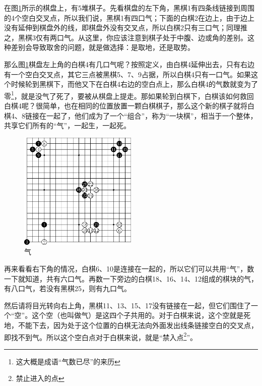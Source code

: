\documentclass[12pt，a4paper, titlepage]{article}
\begin{document}
在图\ref{fig:qi}所示的棋盘上，有5堆棋子。先看棋盘的左下角，黑棋1有四条线链接到周围的4个空白交叉点，所以我们说，黑棋1有四口气；下面的白棋2在边上，由于边上没有延伸到棋盘外的线，即棋盘外没有交叉点，所以白棋2只有三口气；同理推之，黑棋3仅有两口气。从这里，你应该注意到棋子处于中腹、边或角的差别。这种差别会导致取舍的问题，就是做选择：是取地，还是取势。

那么图\ref{fig:qi}棋盘左上角的白棋4有几口气呢？按照定义，由白棋4延伸出去，只有右边有一个空白交叉点，其它三点被黑棋5、7、9占据，所以白棋4只有一口气。如果这个时候轮到黑棋下，而他又下在白棋4右边的空白点上，那么白棋4的气数就变为了零\footnote{这大概是成语“气数已尽”的来历}，就是没气了死了，要被从棋盘上提走。那如果轮到白棋下，白棋该如何救回白棋4呢？很简单，也在相同的位置放置一颗白棋棋子，那么这个新的棋子就将白棋4、8链接在一起了，他们成为了一个“组合”，称为“一块棋”，相当于一个整体，共享它们所有的“气”，一起生，一起死。

\begin{figure}[htbp]   %
	\setlength{\abovecaptionskip}{4pt}    
	\setlength{\belowcaptionskip}{4pt}
	\centering  %
	\includegraphics[width=0.5\textwidth]{fig/qi2.eps}
	\caption{气}
	\label{fig:qi}
\end{figure}

再来看看右下角的情况，白棋6、10是连接在一起的，所以它们可以共用“气”，数一下就知道，共有六口气。再数一下旁边的白棋18、16、14、12组成的棋块的气，有八口气，若没有黑棋25，则有九口气。

然后请将目光转向右上角，黑棋11、13、15、17没有链接在一起，但它们围住了一个“空”。这个空（也叫做气）是这四个子共用的。对于白棋来说，这个空就是死地，不能下去，因为处于这个位置的白棋无法向外面发出线条链接空白的交叉点，即找不到气。所以这个空白点对于白棋来说，就是“禁入点\footnote{禁止进入的点}”。
\end{document}
